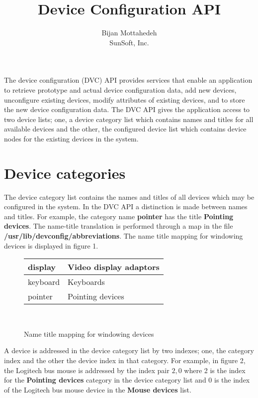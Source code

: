 
\title{Device Configuration API}
\author{Bijan Mottahedeh \\ SunSoft, Inc.}
\parindent 0pt
\textwidth 6.5in
\oddsidemargin 0in


\maketitle

The device configuration (DVC) API provides services that enable an
application to retrieve prototype and actual device configuration data,
add new devices, unconfigure existing devices, modify attributes of
existing devices, and to store the new device configuration data.  The
DVC API gives the application access to two device lists; one, a device
category list which contains names and titles for all available devices
and the other, the configured device list which contains device nodes
for the existing devices in the system.

\section{Device categories}

The device category list contains the names and titles of all devices
which may be configured in the system.  In the DVC API a distinction is
made between names and titles. For example, the category name {\bf
pointer} has the title {\bf Pointing devices}.  The name-title
translation is performed through a map in the file {\bf
/usr/lib/devconfig/abbreviations}.  The name  title mapping for
windowing devices is displayed in figure 1.

\begin{figure}[h]
\begin{center}
\begin{tabular}{@{}|l|l|@{}} \hline
display & Video display adaptors \\ \hline
keyboard & Keyboards \\ \hline
pointer & Pointing devices \\ \hline
\end{tabular} \\
\caption{Name title mapping for windowing devices}
\end{center}
\end{figure}

A device is addressed in the device category list by two indexes; one,
the category index and the other the device index in that
category.  For example, in figure 2, the Logitech bus mouse is
addressed by the index pair \(2,0\) where 2 is the index for the {\bf
Pointing devices} category in the device category list and 0 is the
index of the Logitech bus mouse device in the  {\bf Mouse devices} list. \\

